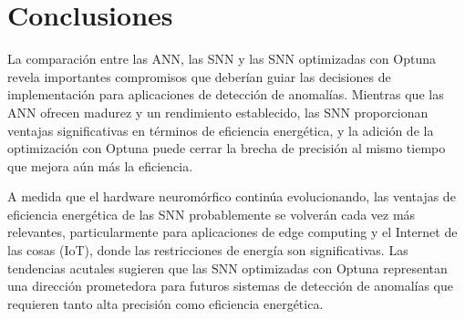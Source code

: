\section{Conclusiones}

La comparación entre las ANN, las SNN y las SNN optimizadas con Optuna revela importantes compromisos que deberían guiar las decisiones de implementación para aplicaciones de detección de anomalías. Mientras que las ANN ofrecen madurez y un rendimiento establecido, las SNN proporcionan ventajas significativas en términos de eficiencia energética, y la adición de la optimización con Optuna puede cerrar la brecha de precisión al mismo tiempo que mejora aún más la eficiencia.

A medida que el hardware neuromórfico continúa evolucionando, las ventajas de eficiencia energética de las SNN probablemente se volverán cada vez más relevantes, particularmente para aplicaciones de edge computing y el Internet de las cosas (IoT), donde las restricciones de energía son significativas. Las tendencias acutales sugieren que las SNN optimizadas con Optuna representan una dirección prometedora para futuros sistemas de detección de anomalías que requieren tanto alta precisión como eficiencia energética.

